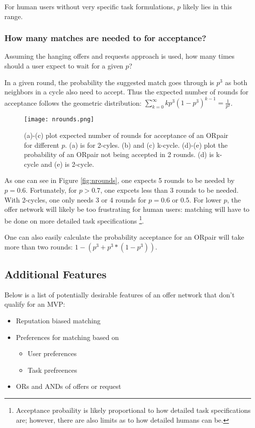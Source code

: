 \documentclass[main.tex]{subfiles}
\begin{document}
For human users without very specific task formulations, $p$ likely lies in this range.

\subsubsection{How many matches are needed to for acceptance?}
Assuming the hanging offers and requests approach is used, how many times should a user expect to wait for a given $p$?

In a given round, the probability the suggested match goes through is $p^3$ as both neighbors in a cycle also need to accept. Thus the expected number of rounds for acceptance follows the geometric distribution: $\sum_{k=0}^{\infty} k p^3 (1 - p^3)^{k-1} = \frac{1}{p^3}$.

\begin{figure}
  \texttt{[image: nrounds.png]}
  \caption{(a)-(c) plot expected number of rounds for acceptance of an ORpair for different $p$. (a) is for 2-cyles. (b) and (c) k-cycle. (d)-(e) plot the probability of an ORpair not being accepted in 2 rounds. (d) is k-cycle and (e) is 2-cycle.}
  \label{nrounds}
\end{figure}

As one can see in Figure \ref{fig:nrounds}, one expects 5 rounds to be needed by $p = 0.6$. Fortunately, for $p > 0.7$, one expcets less than 3 rounds to be needed. With 2-cycles, one only needs 3 or 4 rounds for $p = 0.6$ or $0.5$. For lower $p$, the offer network will likely be too frustrating for human users: matching will have to be done on more detailed task specifications \footnote{Acceptance probaility is likely proportional to how detailed task specifications are; however, there are also limits as to how detailed humans can be.}.

One can also easily calculate the probability acceptance for an ORpair will take more than two rounds: $1 - (p^3 + p^3 * (1 - p^3))$.

\subsection{Additional Features}

Below is a list of potentially desirable features of an offer network that don't qualify for an MVP:
\begin{itemize}
  \item Reputation biased matching
  \item Preferences for matching based on
    \begin{itemize}
      \item User preferences
      \item Task prefreences
    \end{itemize}
  \item ORs and ANDs of offers or request
\end{itemize}
\end{document}
